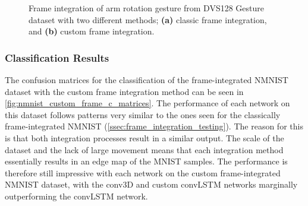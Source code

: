 \begin{figure}[htb]%
    \centering
    \qquad
    \caption{Frame integration of arm rotation gesture from DVS128 Gesture dataset with two different methods; \textbf{(a)} classic frame integration, and \textbf{(b)} custom frame integration.}%
    \label{fig:frame_integration_comparison}%
\end{figure}

\subsubsection{Classification Results}

The confusion matrices for the classification of the frame-integrated NMNIST dataset with the custom frame integration method can be seen in \cref{fig:nmnist_custom_frame_c_matrices}. The performance of each network on this dataset follows patterns very similar to the ones seen for the classically frame-integrated NMNIST (\cref{ssec:frame_integration_testing}). The reason for this is that both integration processes result in a similar output. The scale of the dataset and the lack of large movement means that each integration method essentially results in an edge map of the MNIST samples. The performance is therefore still impressive with each network on the custom frame-integrated NMNIST dataset, with the conv3D and custom convLSTM networks marginally outperforming the convLSTM network.

